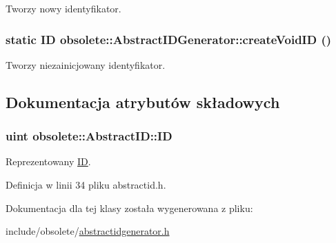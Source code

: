 Tworzy nowy identyfikator. 

\hypertarget{classobsolete_1_1AbstractIDGenerator_a330da88ba80820ca6ce0a29cbbab9e1b}{
\subsubsection[{createVoidID}]{\setlength{\rightskip}{0pt plus 5cm}static {\bf ID} obsolete::AbstractIDGenerator::createVoidID ()}}
\label{classobsolete_1_1AbstractIDGenerator_a330da88ba80820ca6ce0a29cbbab9e1b}


Tworzy niezainicjowany identyfikator. 



\subsection{Dokumentacja atrybutów składowych}
\hypertarget{classobsolete_1_1AbstractID_a5f67fa1c7d96085f0ef41193b60b570c}{
\subsubsection[{ID}]{\setlength{\rightskip}{0pt plus 5cm}uint {\bf obsolete::AbstractID::ID}}}
\label{classobsolete_1_1AbstractID_a5f67fa1c7d96085f0ef41193b60b570c}


Reprezentowany \hyperlink{classobsolete_1_1ID}{ID}. 



Definicja w linii 34 pliku abstractid.h.



Dokumentacja dla tej klasy została wygenerowana z pliku:\begin{DoxyCompactItemize}
\item 
include/obsolete/\hyperlink{abstractidgenerator_8h}{abstractidgenerator.h}\end{DoxyCompactItemize}
